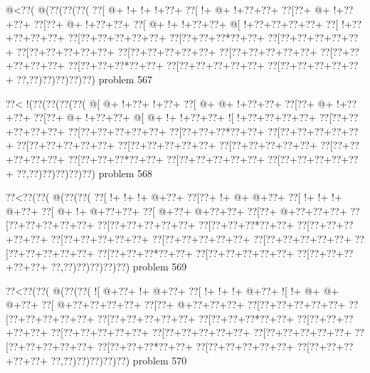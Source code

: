 \vbox{\vbox{\goo
\- @<\0??(\- @(\0??(\0??(\0??(
\0??[\- @+\- !+\- !+\- !+\0??+
\0??[\- !+\- @+\- !+\0??+\0??+
\0??[\0??+\- @+\- !+\0??+\0??+
\0??[\0??+\- @+\- !+\0??+\0??+
\0??[\- @+\- !+\- !+\0??+\0??+
\- @[\- !+\0??+\0??+\0??+\0??+
\0??[\- !+\0??+\0??+\0??+\0??+
\0??[\0??+\0??+\0??+\0??+\0??+
\0??[\0??+\0??+\0??*\0??+\0??+
\0??[\0??+\0??+\0??+\0??+\0??+
\0??[\0??+\0??+\0??+\0??+\0??+
\0??[\0??+\0??+\0??+\0??+\0??+
\0??[\0??+\0??+\0??+\0??+\0??+
\0??[\0??+\0??+\0??+\0??+\0??+
\0??[\0??+\0??+\0??*\0??+\0??+
\0??[\0??+\0??+\0??+\0??+\0??+
\0??[\0??+\0??+\0??+\0??+\0??+
\0??,\0??)\0??)\0??)\0??)\0??)
}
\hfil problem 567\hfil\break
}

\vbox{\vbox{\goo
\0??<\- !(\0??(\0??(\0??(\0??(
\- @[\- @+\- !+\0??+\- !+\0??+
\0??[\- @+\- @+\- !+\0??+\0??+
\0??[\0??+\- @+\- !+\0??+\0??+
\0??[\0??+\- @+\- !+\0??+\0??+
\- @[\- @+\- !+\- !+\0??+\0??+
\- ![\- !+\0??+\0??+\0??+\0??+
\0??[\0??+\0??+\0??+\0??+\0??+
\0??[\0??+\0??+\0??+\0??+\0??+
\0??[\0??+\0??+\0??*\0??+\0??+
\0??[\0??+\0??+\0??+\0??+\0??+
\0??[\0??+\0??+\0??+\0??+\0??+
\0??[\0??+\0??+\0??+\0??+\0??+
\0??[\0??+\0??+\0??+\0??+\0??+
\0??[\0??+\0??+\0??+\0??+\0??+
\0??[\0??+\0??+\0??*\0??+\0??+
\0??[\0??+\0??+\0??+\0??+\0??+
\0??[\0??+\0??+\0??+\0??+\0??+
\0??,\0??)\0??)\0??)\0??)\0??)
}
\hfil problem 568\hfil\break
}

\vbox{\vbox{\goo
\0??<\0??(\0??(\- @(\0??(\0??(
\0??[\- !+\- !+\- !+\- @+\0??+
\0??[\0??+\- !+\- @+\- @+\0??+
\0??[\- !+\- !+\- !+\- @+\0??+
\0??[\- @+\- !+\- @+\0??+\0??+
\0??[\- @+\0??+\- @+\0??+\0??+
\0??[\0??+\- @+\0??+\0??+\0??+
\0??[\0??+\0??+\0??+\0??+\0??+
\0??[\0??+\0??+\0??+\0??+\0??+
\0??[\0??+\0??+\0??*\0??+\0??+
\0??[\0??+\0??+\0??+\0??+\0??+
\0??[\0??+\0??+\0??+\0??+\0??+
\0??[\0??+\0??+\0??+\0??+\0??+
\0??[\0??+\0??+\0??+\0??+\0??+
\0??[\0??+\0??+\0??+\0??+\0??+
\0??[\0??+\0??+\0??*\0??+\0??+
\0??[\0??+\0??+\0??+\0??+\0??+
\0??[\0??+\0??+\0??+\0??+\0??+
\0??,\0??)\0??)\0??)\0??)\0??)
}
\hfil problem 569\hfil\break
}

\vbox{\vbox{\goo
\0??<\0??(\0??(\- @(\0??(\0??(
\- ![\- @+\0??+\- !+\- @+\0??+
\0??[\- !+\- !+\- !+\- @+\0??+
\- ![\- !+\- @+\- @+\- @+\0??+
\0??[\- @+\0??+\0??+\0??+\0??+
\0??[\0??+\- @+\0??+\0??+\0??+
\0??[\0??+\0??+\0??+\0??+\0??+
\0??[\0??+\0??+\0??+\0??+\0??+
\0??[\0??+\0??+\0??+\0??+\0??+
\0??[\0??+\0??+\0??*\0??+\0??+
\0??[\0??+\0??+\0??+\0??+\0??+
\0??[\0??+\0??+\0??+\0??+\0??+
\0??[\0??+\0??+\0??+\0??+\0??+
\0??[\0??+\0??+\0??+\0??+\0??+
\0??[\0??+\0??+\0??+\0??+\0??+
\0??[\0??+\0??+\0??*\0??+\0??+
\0??[\0??+\0??+\0??+\0??+\0??+
\0??[\0??+\0??+\0??+\0??+\0??+
\0??,\0??)\0??)\0??)\0??)\0??)
}
\hfil problem 570\hfil\break
}

